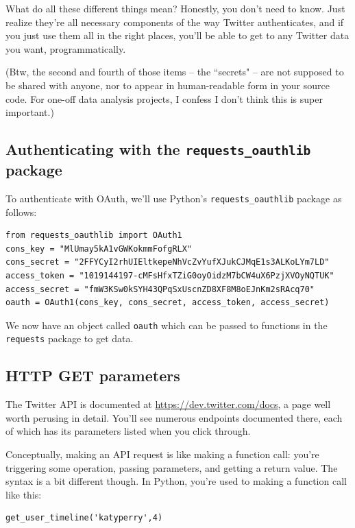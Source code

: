 \documentclass[12pt]{article}
\begin{document}
What do all these different things mean? Honestly, you don't need to know.
Just realize they're all necessary components of the way Twitter
authenticates, and if you just use them all in the right places, you'll be
able to get to any Twitter data you want, programmatically.

(Btw, the second and fourth of those items -- the ``secrets" -- are not
supposed to be shared with anyone, nor to appear in human-readable form in
your source code. For one-off data analysis projects, I confess I don't think
this is super important.)

\subsection{Authenticating with the \texttt{requests\_oauthlib} package}

To authenticate with OAuth, we'll use Python's \texttt{requests\_oauthlib}
package as follows:

\begin{Verbatim}[fontsize=\small,samepage=true,frame=none]
from requests_oauthlib import OAuth1
cons_key = "MlUmay5kA1vGWKokmmFofgRLX"
cons_secret = "2FFYCyI2rhUIEltkepeNhVcZvYufXJukCJMqE1s3ALKoLYm7LD"
access_token = "1019144197-cMFsHfxTZiG0oyOidzM7bCW4uX6PzjXVOyNQTUK"
access_secret = "fmW3KSw0kSYH43QPqSxUscnZD8XF8M8oEJnKm2sRAcq70"
oauth = OAuth1(cons_key, cons_secret, access_token, access_secret)
\end{Verbatim}

We now have an object called \texttt{oauth} which can be passed to functions
in the \texttt{requests} package to get data.

\subsection{HTTP GET parameters}

The Twitter API is documented at \url{https://dev.twitter.com/docs}, a page
well worth perusing in detail. You'll see numerous endpoints documented there,
each of which has its parameters listed when you click through.

Conceptually, making an API request is like making a function call: you're
triggering some operation, passing parameters, and getting a return value. The
syntax is a bit different though. In Python, you're used to making a function
call like this:

\begin{Verbatim}[fontsize=\small,samepage=true,frame=none]
get_user_timeline('katyperry',4)
\end{Verbatim}
\end{document}
